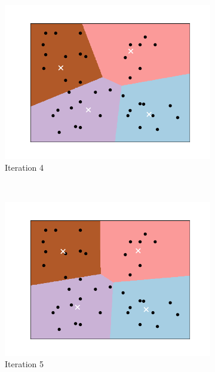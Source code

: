 \documentclass[a4paper, 12pt]{article}
\numberwithin{equation}{section}
\numberwithin{figure}{section}
\theoremstyle{definition}
\begin{document}
\begin{figure}[ht]
\begin{subfigure}[b]{0.49\textwidth}
		\centering 
		\includegraphics[scale=0.4]{graphics/k_means_iter4.png}
		\vspace{-0.75em}
		\caption{Iteration 4}
	\end{subfigure}~%
	\begin{subfigure}[b]{0.49\textwidth}
		\centering 
		\includegraphics[scale=0.4]{graphics/k_means_iter5.png}
		\vspace{-0.75em}
		\caption{Iteration 5}
	\end{subfigure}
	\begin{subfigure}[b]{0.66\textwidth}
		\centering 

\end{subfigure}
\end{figure}
\end{document}
